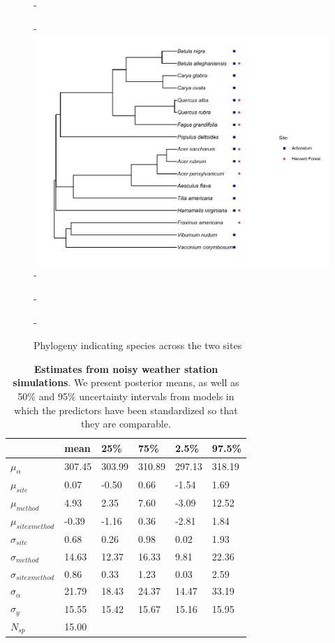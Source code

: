 \documentclass{article}\usepackage[]{graphicx}\usepackage[]{color}
\begin{document}
{\begin{figure} [H]
  -\begin{center}
  -\includegraphics[width=12cm]{..//phylodata/microtree_hfandts.pdf}
  -\caption{Phylogeny indicating species across the two sites}\label{fig:phylo}
  -\end{center}
  -\end{figure}}

\begin{table}[ht]
\centering
\caption{\textbf{Estimates from noisy weather station simulations}. We present posterior means, as well as 50\% and 95\% uncertainty intervals from models in which the predictors have been standardized so that they are comparable.} 
\label{tab:noisyws}
\begingroup\footnotesize
\begin{tabular}{|p{}|p{}p{}p{}p{}p{}|}
  \hline
 & mean & 25\% & 75\% & 2.5\% & 97.5\% \\ 
  \hline
$\mu_{\alpha}$ & 307.45 & 303.99 & 310.89 & 297.13 & 318.19 \\ 
  $\mu_{site}$ & 0.07 & -0.50 & 0.66 & -1.54 & 1.69 \\ 
  $\mu_{method}$ & 4.93 & 2.35 & 7.60 & -3.09 & 12.52 \\ 
  $\mu_{sitexmethod}$ & -0.39 & -1.16 & 0.36 & -2.81 & 1.84 \\ 
  $\sigma_{site}$ & 0.68 & 0.26 & 0.98 & 0.02 & 1.93 \\ 
  $\sigma_{method}$ & 14.63 & 12.37 & 16.33 & 9.81 & 22.36 \\ 
  $\sigma_{sitexmethod}$ & 0.86 & 0.33 & 1.23 & 0.03 & 2.59 \\ 
  $\sigma_{\alpha}$ & 21.79 & 18.43 & 24.37 & 14.47 & 33.19 \\ 
  $\sigma_{y}$ & 15.55 & 15.42 & 15.67 & 15.16 & 15.95 \\ 
   \hline
$N_{sp}$ & 15.00 &  &  &  &  \\ 
   \hline
\end{tabular}
\endgroup
\end{table}
\end{document}
